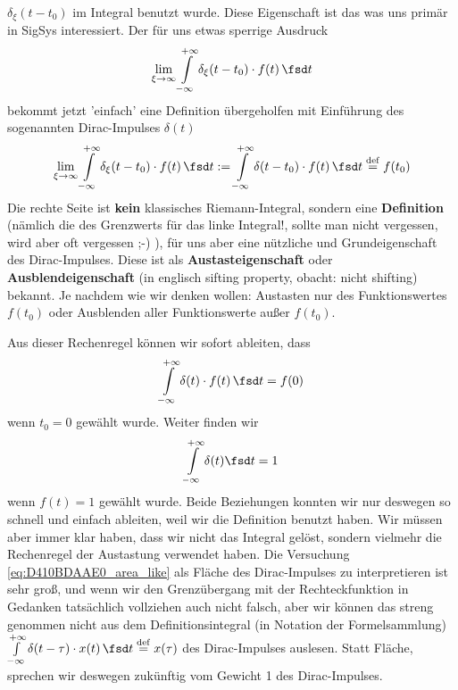 \begin{Werkzeug}
$\delta_\xi(t-t_0)$ im Integral benutzt wurde.
%
Diese Eigenschaft ist das was uns primär in SigSys interessiert.
%
Der für uns etwas sperrige Ausdruck
\begin{equation}
\lim_{\xi\to\infty} \int\limits_{-\infty}^{+\infty}
\delta_\xi(t-t_0) \cdot f(t) \, \fsd t
\end{equation}
bekommt jetzt 'einfach' eine Definition übergeholfen mit
Einführung des sogenannten Dirac-Impulses $\delta(t)$
\begin{equation}
\label{eq:DiracDistrDef}
\lim_{\xi\to\infty} \int\limits_{-\infty}^{+\infty}
\delta_\xi(t-t_0) \cdot f(t) \, \fsd t
:= \int\limits_{-\infty}^{+\infty} \delta(t-t_0) \cdot f(t) \, \fsd t \stackrel{\mathrm{def}}= f(t_0)
\end{equation}
%
Die rechte Seite ist \textbf{kein} klassisches Riemann-Integral, sondern eine
\textbf{Definition} (nämlich die des Grenzwerts für das linke Integral!,
sollte man nicht vergessen, wird aber oft vergessen ;-) ),
für uns aber eine nützliche  und Grundeigenschaft des
Dirac-Impulses. Diese ist als \textbf{Austasteigenschaft} oder
\textbf{Ausblendeigenschaft} (in englisch sifting property, obacht: nicht shifting)
bekannt. Je nachdem wie wir denken wollen:
Austasten nur des Funktionswertes $f(t_0)$ oder Ausblenden aller Funktionswerte
außer $f(t_0)$.

Aus dieser Rechenregel können wir sofort ableiten, dass
\begin{equation}
\label{}
\int\limits_{-\infty}^{+\infty} \delta(t) \cdot f(t) \, \fsd t = f(0)
\end{equation}
wenn $t_0=0$ gewählt wurde.
%
Weiter finden wir
\begin{equation}
\label{eq:D410BDAAE0_area_like}
\int\limits_{-\infty}^{+\infty} \delta(t) \fsd t = 1
\end{equation}
wenn $f(t)=1$ gewählt wurde.
%
Beide Beziehungen konnten wir nur deswegen so schnell und einfach ableiten, weil
wir die Definition benutzt haben. Wir müssen aber immer klar haben, dass wir
nicht das Integral gelöst, sondern vielmehr die Rechenregel der Austastung
verwendet haben.
%
Die Versuchung \eqref{eq:D410BDAAE0_area_like} als Fläche
des Dirac-Impulses zu interpretieren
ist sehr groß, und wenn wir den Grenzübergang mit der Rechteckfunktion in Gedanken
tatsächlich vollziehen auch nicht falsch, aber wir können das streng genommen
nicht aus dem Definitionsintegral (in Notation der Formelsammlung)
$\int\limits_{-\infty}^{+\infty} \delta(t-\tau) \cdot x(t) \, \fsd t \stackrel{\mathrm{def}}= x(\tau)$
des Dirac-Impulses auslesen.
%
Statt Fläche, sprechen wir deswegen zukünftig vom Gewicht 1 des Dirac-Impulses.

\end{Werkzeug}

